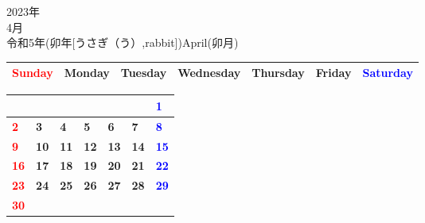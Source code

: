 \documentclass[a4paper,landscape]{jsarticle}
\newcommand{\dig}{\hspace{29mm}}
\newcommand{\tdig}{\hspace{27mm}}
\newcommand{\LBF}{\LARGE\textbf}
\begin{document}
\newpage

\begin{center}
	\HUGE 2023年\\
	\huge 4月\\
	\large 令和5年(卯年[うさぎ（う）,rabbit])April(卯月)
\end{center}

\begingroup
\renewcommand{\arraystretch}{1.4}
\begin{tabular}{|>{\centering\arraybackslash}p{32mm}|>{\centering\arraybackslash}p{32mm}|>{\centering\arraybackslash}p{32mm}|>{\centering\arraybackslash}p{32mm}|>{\centering\arraybackslash}p{32mm}|>{\centering\arraybackslash}p{32mm}|>{\centering\arraybackslash}p{32mm}|}
\hline
\textcolor{red}{\large Sunday}&\large Monday&\large Tuesday&\large Wednesday&\large Thursday&\large Friday&\textcolor{blue}{\large Saturday}\\
\hline
\end{tabular}
\endgroup

\begingroup
\renewcommand{\arraystretch}{4}
\begin{tabular}{|p{32mm}|p{32mm}|p{32mm}|p{32mm}|p{32mm}|p{32mm}|p{32mm}|}
\hline
&&&&&&\raisebox{30pt} {\dig\textcolor{blue}{\LBF{1}}}\\
\hline
\raisebox{30pt} {\dig\textcolor{red}{\LBF{2}}}&\raisebox{30pt} {\dig\LBF{3}}&\raisebox{30pt} {\dig\LBF{4}}&\raisebox{30pt} {\dig\LBF{5}}&\raisebox{30pt} {\dig\LBF{6}}&\raisebox{30pt} {\dig\LBF{7}}&\raisebox{30pt} {\dig\textcolor{blue}{\LBF{8}}}\\
\hline
\raisebox{30pt} {\dig\textcolor{red}{\LBF{9}}}&\raisebox{30pt} {\tdig\LBF{10}}&\raisebox{30pt} {\tdig\LBF{11}}&\raisebox{30pt} {\tdig\LBF{12}}&\raisebox{30pt} {\tdig\LBF{13}}&\raisebox{30pt} {\tdig\LBF{14}}&\raisebox{30pt} {\tdig\textcolor{blue}{\LBF{15}}}\\
\hline
\raisebox{30pt} {\tdig\textcolor{red}{\LBF{16}}}&\raisebox{30pt} {\tdig\LBF{17}}&\raisebox{30pt} {\tdig\LBF{18}}&\raisebox{30pt} {\tdig\LBF{19}}&\raisebox{30pt} {\tdig\LBF{20}}&\raisebox{30pt} {\tdig\LBF{21}}&\raisebox{30pt} {\tdig\textcolor{blue}{\LBF{22}}}\\
\hline
\raisebox{30pt} {\tdig\textcolor{red}{\LBF{23}}}&\raisebox{30pt} {\tdig\LBF{24}}&\raisebox{30pt} {\tdig\LBF{25}}&\raisebox{30pt} {\tdig\LBF{26}}&\raisebox{30pt} {\tdig\LBF{27}}&\raisebox{30pt} {\tdig\LBF{28}}&\raisebox{30pt} {\tdig\textcolor{blue}{\LBF{29}}}\\
\hline
\raisebox{30pt} {\tdig\textcolor{red}{\LBF{30}}}&&&&&&\\
\hline
\end{tabular}
\endgroup
\end{document}
